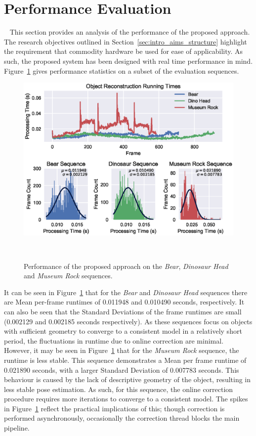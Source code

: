 \section{Performance Evaluation}
~\label{sec:probobj_performance}
This section provides an analysis of the performance of the proposed approach. The research 
objectives outlined in Section~\ref{sec:intro_aims_structure} highlight the requirement that 
commodity hardware be used for ease of applicability. As such, the proposed system has been 
designed with real time performance in mind. Figure~\ref{figure:probobj_timing} gives performance 
statistics on a subset of the evaluation sequences.
\begin{figure}[!htbp]
  \centering
  \includegraphics[width=\linewidth]{figures/object_recon/timings_objects.eps}
  \caption[Object Reconstruction Performance.]
  {Performance of the proposed approach on the \textit{Bear}, \textit{Dinosaur Head} and 
  \textit{Museum Rock} sequences.}
~\label{figure:probobj_timing}
\end{figure}

It can be seen in Figure~\ref{figure:probobj_timing} that for the \textit{Bear} and 
\textit{Dinosaur Head} sequences there are Mean per-frame runtimes of 0.011948 and 
0.010490 seconds, respectively. It can also be seen that the Standard Deviations of the frame 
runtimes are small (0.002129 and 0.002185 seconds respectively). As these sequences focus on objects 
with sufficient geometry to converge to a consistent model in a relatively short period, the 
fluctuations in runtime due to online correction are minimal. However, it may be seen in 
Figure~\ref{figure:probobj_timing} that for the \textit{Museum Rock} sequence, the runtime is 
less stable. This sequence demonstrates a Mean per frame runtime of 0.021890 seconds, with 
a larger Standard Deviation of 0.007783 seconds. This behaviour is caused by the lack of 
descriptive geometry of the object, resulting in less stable pose estimation. As such, for this 
sequence, the online correction procedure requires more iterations to converge to a consistent 
model. The spikes in Figure~\ref{figure:probobj_timing} reflect the practical implications of 
this; though correction is performed asynchronously, occasionally the correction thread blocks the 
main pipeline.

